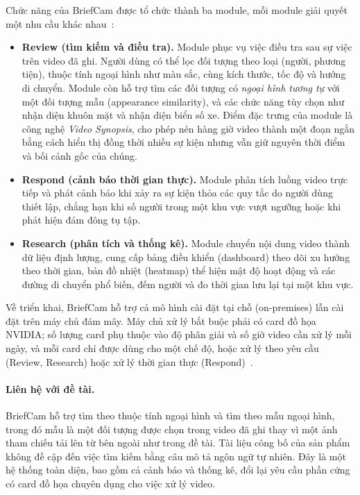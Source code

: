 Chức năng của BriefCam được tổ chức thành ba module, mỗi module giải quyết một nhu cầu khác nhau~\cite{milestone2026briefcam}:
\begin{itemize}
    \item \textbf{Review (tìm kiếm và điều tra).} Module phục vụ việc điều tra sau sự việc trên video đã ghi. Người dùng có thể lọc đối tượng theo loại (người, phương tiện), thuộc tính ngoại hình như màu sắc, cùng kích thước, tốc độ và hướng di chuyển. Module còn hỗ trợ tìm các đối tượng có \emph{ngoại hình tương tự} với một đối tượng mẫu (appearance similarity), và các chức năng tùy chọn như nhận diện khuôn mặt và nhận diện biển số xe. Điểm đặc trưng của module là công nghệ \emph{Video Synopsis}, cho phép nén hàng giờ video thành một đoạn ngắn bằng cách hiển thị đồng thời nhiều sự kiện nhưng vẫn giữ nguyên thời điểm và bối cảnh gốc của chúng.
    \item \textbf{Respond (cảnh báo thời gian thực).} Module phân tích luồng video trực tiếp và phát cảnh báo khi xảy ra sự kiện thỏa các quy tắc do người dùng thiết lập, chẳng hạn khi số người trong một khu vực vượt ngưỡng hoặc khi phát hiện đám đông tụ tập.
    \item \textbf{Research (phân tích và thống kê).} Module chuyển nội dung video thành dữ liệu định lượng, cung cấp bảng điều khiển (dashboard) theo dõi xu hướng theo thời gian, bản đồ nhiệt (heatmap) thể hiện mật độ hoạt động và các đường di chuyển phổ biến, đếm người và đo thời gian lưu lại tại một khu vực.
\end{itemize}

Về triển khai, BriefCam hỗ trợ cả mô hình cài đặt tại chỗ (on-premises) lẫn cài đặt trên máy chủ đám mây. Máy chủ xử lý bắt buộc phải có card đồ họa NVIDIA; số lượng card phụ thuộc vào độ phân giải và số giờ video cần xử lý mỗi ngày, và mỗi card chỉ được dùng cho một chế độ, hoặc xử lý theo yêu cầu (Review, Research) hoặc xử lý thời gian thực (Respond)~\cite{milestone2026briefcamfaq}.

\paragraph{Liên hệ với đề tài.} BriefCam hỗ trợ tìm theo thuộc tính ngoại hình và tìm theo mẫu ngoại hình, trong đó mẫu là một đối tượng được chọn trong video đã ghi thay vì một ảnh tham chiếu tải lên từ bên ngoài như trong đề tài. Tài liệu công bố của sản phẩm không đề cập đến việc tìm kiếm bằng câu mô tả ngôn ngữ tự nhiên. Đây là một hệ thống toàn diện, bao gồm cả cảnh báo và thống kê, đổi lại yêu cầu phần cứng có card đồ họa chuyên dụng cho việc xử lý video.

